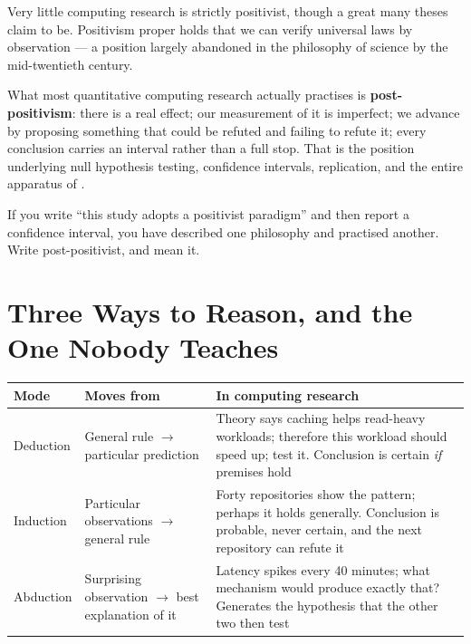 \begin{conceptbox}
Very little computing research is strictly positivist, though a great many
theses claim to be. Positivism proper holds that we can verify universal laws
by observation --- a position largely abandoned in the philosophy of science by
the mid-twentieth century.

\medskip
What most quantitative computing research actually practises is
\textbf{post-positivism}: there is a real effect; our measurement of it is
imperfect; we advance by proposing something that could be refuted and failing
to refute it; every conclusion carries an interval rather than a full stop.
That is the position underlying null hypothesis testing, confidence intervals,
replication, and the entire apparatus of .

\medskip
If you write ``this study adopts a positivist paradigm'' and then report a
confidence interval, you have described one philosophy and practised another.
Write post-positivist, and mean it.
\end{conceptbox}

\section{Three Ways to Reason, and the One Nobody Teaches}

\begin{center}
\small
\begin{tabular}{@{}L{2.3cm}L{5.0cm}L{6.6cm}@{}}
\toprule
\textbf{Mode} & \textbf{Moves from} & \textbf{In computing research} \\
\midrule
Deduction
  & General rule $\rightarrow$ particular prediction
  & Theory says caching helps read-heavy workloads; therefore this workload
    should speed up; test it. Conclusion is certain \emph{if} premises hold \\
Induction
  & Particular observations $\rightarrow$ general rule
  & Forty repositories show the pattern; perhaps it holds generally. Conclusion
    is probable, never certain, and the next repository can refute it \\
Abduction
  & Surprising observation $\rightarrow$ best explanation of it
  & Latency spikes every 40 minutes; what mechanism would produce exactly that?
    Generates the hypothesis that the other two then test \\
\bottomrule
\end{tabular}
\end{center}

